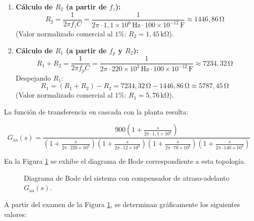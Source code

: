 \begin{enumerate}
    \item \textbf{Cálculo de $R_2$ (a partir de $f_z$):}
    \begin{equation}
        R_2 = \frac{1}{2\pi f_z C} = \frac{1}{2\pi \cdot 1,1 \times 10^6\,\si{\hertz} \cdot 100 \times 10^{-12}\,\si{\farad}} \approx 1446,86\,\si{\ohm}
        \label{eq.ej2:calculo_R2}
    \end{equation}
    (Valor normalizado comercial al $1\%$: $R_2 = 1,45\,\si{\kilo\ohm}$).

    \item \textbf{Cálculo de $R_1$ (a partir de $f_p$ y $R_2$):}
    \begin{equation}
        R_1 + R_2 = \frac{1}{2\pi f_p C} = \frac{1}{2\pi \cdot 220 \times 10^3\,\si{\hertz} \cdot 100 \times 10^{-12}\,\si{\farad}} \approx 7234,32\,\si{\ohm}
    \end{equation}
    Despejando $R_1$:
    \begin{equation}
        R_1 = (R_1 + R_2) - R_2 = 7234,32\,\si{\ohm} - 1446,86\,\si{\ohm} \approx 5787,45\,\si{\ohm}
        \label{eq.ej2:calculo_R1}
    \end{equation}
    (Valor normalizado comercial al $1\%$: $R_1 = 5,76\,\si{\kilo\ohm}$).
\end{enumerate}


La función de transferencia en cascada con la planta resulta:

\begin{equation}
    G_{\text{aa}}(s) = \frac{900 \left(1 + \frac{s}{2\pi \cdot 1,1 \times 10^6}\right)}{\left(1 + \frac{s}{2\pi \cdot 220 \times 10^3}\right) \left(1 + \frac{s}{2\pi \cdot 12 \times 10^3}\right) \left(1 + \frac{s}{2\pi \cdot 70 \times 10^3}\right) \left(1 + \frac{s}{2\pi \cdot 140 \times 10^3}\right)}
    \label{eq.ej2:fdt_sistema_aa}
\end{equation}

En la Figura \ref{fig.ej2:bode_aa} se exhibe el diagrama de Bode correspondiente a esta topología.

\begin{figure}[!ht]
    \centering
    
    \caption{Diagrama de Bode del sistema con compensador de atraso-adelanto $G_{\text{aa}}(s)$.}
    \label{fig.ej2:bode_aa}
\end{figure}

A partir del examen de la Figura \ref{fig.ej2:bode_aa}, se determinan gráficamente los siguientes valores:

